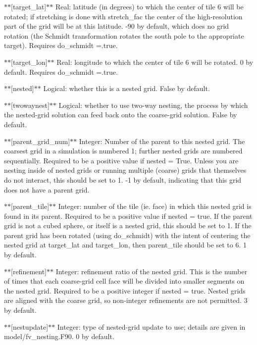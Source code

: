 $\ast$$\ast$\mbox{[}target\-\_\-lat\mbox{]}$\ast$$\ast$ Real\-: latitude (in degrees) to which the center of tile 6 will be rotated; if stretching is done with stretch\-\_\-fac the center of the high-\/resolution part of the grid will be at this latitude. -\/90 by default, which does no grid rotation (the Schmidt transformation rotates the south pole to the appropriate target). Requires do\-\_\-schmidt =.true.

$\ast$$\ast$\mbox{[}target\-\_\-lon\mbox{]}$\ast$$\ast$ Real\-: longitude to which the center of tile 6 will be rotated. 0 by default. Requires do\-\_\-schmidt =.true.

$\ast$$\ast$\mbox{[}nested\mbox{]}$\ast$$\ast$ Logical\-: whether this is a nested grid. False by default.

$\ast$$\ast$\mbox{[}twowaynest\mbox{]}$\ast$$\ast$ Logical\-: whether to use two-\/way nesting, the process by which the nested-\/grid solution can feed back onto the coarse-\/grid solution. False by default.

$\ast$$\ast$\mbox{[}parent\-\_\-grid\-\_\-num\mbox{]}$\ast$$\ast$ Integer\-: Number of the parent to this nested grid. The coarsest grid in a simulation is numbered 1; further nested grids are numbered sequentially. Required to be a positive value if nested = True. Unless you are nesting inside of nested grids or running multiple (coarse) grids that themselves do not interact, this should be set to 1. -\/1 by default, indicating that this grid does not have a parent grid.

$\ast$$\ast$\mbox{[}parent\-\_\-tile\mbox{]}$\ast$$\ast$ Integer\-: number of the tile (ie. face) in which this nested grid is found in its parent. Required to be a positive value if nested = true. If the parent grid is not a cubed sphere, or itself is a nested grid, this should be set to 1. If the parent grid has been rotated (using do\-\_\-schmidt) with the intent of centering the nested grid at target\-\_\-lat and target\-\_\-lon, then parent\-\_\-tile should be set to 6. 1 by default.

$\ast$$\ast$\mbox{[}refinement\mbox{]}$\ast$$\ast$ Integer\-: refinement ratio of the nested grid. This is the number of times that each coarse-\/grid cell face will be divided into smaller segments on the nested grid. Required to be a positive integer if nested = true. Nested grids are aligned with the coarse grid, so non-\/integer refinements are not permitted. 3 by default.

$\ast$$\ast$\mbox{[}nestupdate\mbox{]}$\ast$$\ast$ Integer\-: type of nested-\/grid update to use; details are given in model/fv\-\_\-nesting.\-F90. 0 by default.

